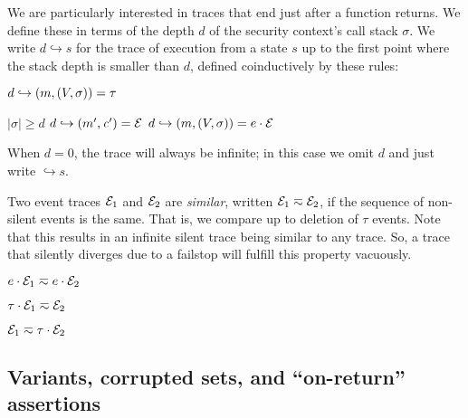 \documentclass[10pt,conference]{ieeetran}%
\theoremstyle{definition}
\begin{document}
We are particularly interested in traces that end just after a function returns.
We define these in terms of the depth \(d\) of the security context's call stack \(\sigma\).
We write \(d \hookrightarrow s\) for the trace of execution from a state \(s\)
up to the first point where the stack depth is smaller than \(d\), defined
coinductively by these rules:

         {\(d \hookrightarrow (m,(V,\sigma)) = \tau\)}

              {\(|\sigma| \geq d\)}
              {\(d \hookrightarrow (m',\mathit{c}') = \mathcal{E}\)}
              {\(d \hookrightarrow (m,(V,\sigma)) = e \cdot \mathcal{E}\)}

\noindent
When \(d = 0\), the trace will always be infinite; in this case we
omit \(d\) and just write \(\hookrightarrow s\).

Two event traces $\mathcal{E}_1$ and $\mathcal{E}_2$ are {\em similar},
written \(\mathcal{E}_1 \eqsim \mathcal{E}_2\), if the sequence of non-silent events
is the same. That is, we compare up to deletion of \(\tau\) events.
Note that this results in an infinite silent trace being similar to
any trace. So, a trace that silently diverges due to a failstop will
fulfill this property vacuously.

\begin{minipage}{.4\columnwidth}
  \judgment{}{\(\obsT \eqsim \obsT\)}
\end{minipage}
\begin{minipage}{.4\columnwidth}
           {\(e \cdot \mathcal{E}_1 \eqsim e \cdot \mathcal{E}_2\)}
\end{minipage}

\begin{minipage}{.4\columnwidth}
           {\(\tau \cdot \mathcal{E}_1 \eqsim \mathcal{E}_2\)}
\end{minipage}
\begin{minipage}{.4\columnwidth}
           {\(\mathcal{E}_1 \eqsim \tau \cdot \mathcal{E}_2\)}
\end{minipage}

\subsection{Variants, corrupted sets, and ``on-return'' assertions}
\label{sec:props}
\end{document}
